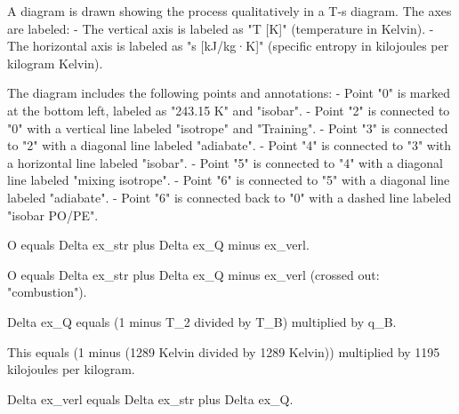 A diagram is drawn showing the process qualitatively in a T-s diagram. The axes are labeled:  
- The vertical axis is labeled as "T [K]" (temperature in Kelvin).  
- The horizontal axis is labeled as "s [kJ/kg·K]" (specific entropy in kilojoules per kilogram Kelvin).  

The diagram includes the following points and annotations:  
- Point "0" is marked at the bottom left, labeled as "243.15 K" and "isobar".  
- Point "2" is connected to "0" with a vertical line labeled "isotrope" and "Training".  
- Point "3" is connected to "2" with a diagonal line labeled "adiabate".  
- Point "4" is connected to "3" with a horizontal line labeled "isobar".  
- Point "5" is connected to "4" with a diagonal line labeled "mixing isotrope".  
- Point "6" is connected to "5" with a diagonal line labeled "adiabate".  
- Point "6" is connected back to "0" with a dashed line labeled "isobar PO/PE".

O equals Delta ex_str plus Delta ex_Q minus ex_verl.  

O equals Delta ex_str plus Delta ex_Q minus ex_verl (crossed out: "combustion").  

Delta ex_Q equals (1 minus T_2 divided by T_B) multiplied by q_B.  

This equals (1 minus (1289 Kelvin divided by 1289 Kelvin)) multiplied by 1195 kilojoules per kilogram.  

Delta ex_verl equals Delta ex_str plus Delta ex_Q.